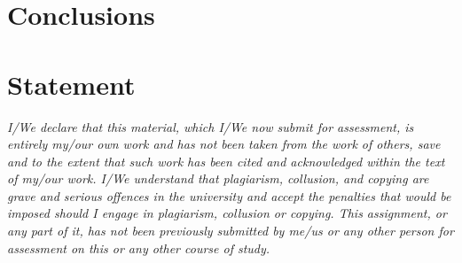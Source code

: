 \documentclass[runningheads]{llncs}
\begin{document}
\section{Conclusions}
\label{sec:conclusions}

\section*{Statement}
\textit{I/We declare that this material, which I/We now submit for assessment, is entirely my/our own work and has not been taken from the work of others, save and to the extent that such work has been cited and acknowledged within the text of my/our work. I/We understand that plagiarism, collusion, and copying are grave and serious offences in the university and accept the penalties that would be imposed should I engage in plagiarism, collusion or copying. This assignment, or any part of it, has not been previously submitted by me/us or any other person for assessment on this or any other course of study.}




\end{document}
